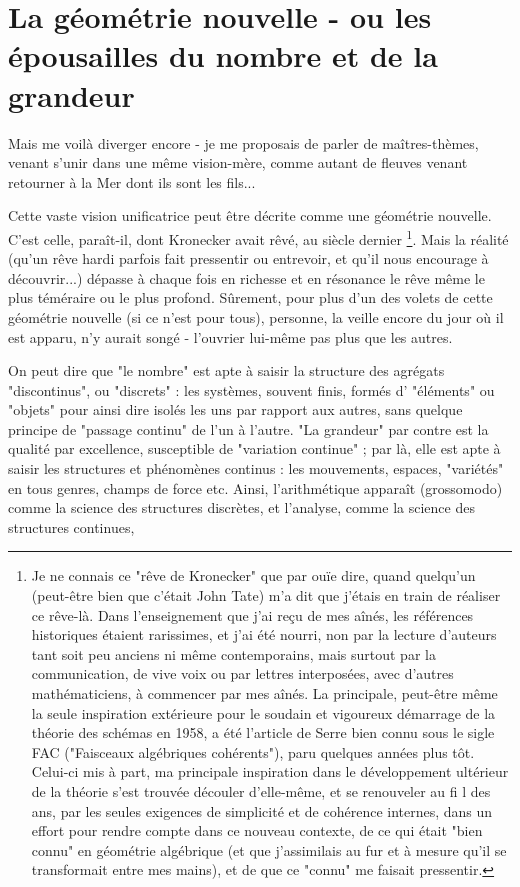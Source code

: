 \section{La géométrie nouvelle - ou les épousailles du nombre et de la grandeur}

Mais me voilà diverger encore - je me proposais de parler de maîtres-thèmes, venant s'unir dans une même vision-mère, comme autant de fleuves venant retourner à la Mer dont ils sont les fils...

Cette vaste vision unificatrice peut être décrite comme une géométrie nouvelle. C'est celle, paraît-il, dont Kronecker avait rêvé, au siècle dernier \footnote{Je ne connais ce "rêve de Kronecker" que par ouïe dire, quand quelqu'un (peut-être bien que c'était John Tate) m'a dit que j'étais en train de réaliser ce rêve-là. Dans l'enseignement que j'ai reçu de mes aînés, les références historiques étaient rarissimes, et j'ai été nourri, non par la lecture d'auteurs tant soit peu anciens ni même contemporains, mais surtout par la communication, de vive voix ou par lettres interposées, avec d'autres mathématiciens, à commencer par mes aînés. La principale, peut-être même la seule inspiration extérieure pour le soudain et vigoureux démarrage de la théorie des schémas en 1958, a été l'article de Serre bien connu sous le sigle FAC ("Faisceaux algébriques cohérents"), paru quelques années plus tôt. Celui-ci mis à part, ma principale inspiration dans le développement ultérieur de la théorie s'est trouvée découler d'elle-même, et se renouveler au fi l des ans, par les seules exigences de simplicité et de cohérence internes, dans un effort pour rendre compte dans ce nouveau contexte, de ce qui était "bien connu" en géométrie algébrique (et que j'assimilais au fur et à mesure qu'il se transformait entre mes mains), et de que ce "connu" me faisait pressentir.}. Mais la réalité (qu'un rêve hardi parfois fait pressentir ou entrevoir, et qu'il nous encourage à découvrir...) dépasse à chaque fois en richesse et en résonance le rêve même le plus téméraire ou le plus profond. Sûrement, pour plus d'un des volets de cette géométrie nouvelle (si ce n'est pour tous), personne, la veille encore du jour où il est apparu, n'y aurait songé - l'ouvrier lui-même pas plus que les autres.

On peut dire que "le nombre" est apte à saisir la structure des agrégats "discontinus", ou "discrets" : les systèmes, souvent finis, formés d' "éléments" ou "objets" pour ainsi dire isolés les uns par rapport aux autres, sans quelque principe de "passage continu" de l'un à l'autre. "La grandeur" par contre est la qualité par excellence, susceptible de "variation continue" ; par là, elle est apte à saisir les structures et phénomènes continus : les mouvements, espaces, "variétés" en tous genres, champs de force etc. Ainsi, l'arithmétique apparaît (grossomodo) comme la science des structures discrètes, et l'analyse, comme la science des structures continues,

